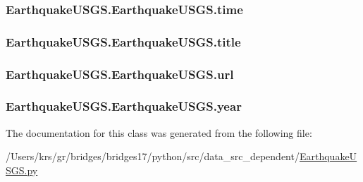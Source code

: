 \subsubsection[{time}]{\setlength{\rightskip}{0pt plus 5cm}Earthquake\+U\+S\+G\+S.\+Earthquake\+U\+S\+G\+S.\+time}\label{class_earthquake_u_s_g_s_1_1_earthquake_u_s_g_s_a6273e67dccfc163a5bd72974371218a0}
\hypertarget{class_earthquake_u_s_g_s_1_1_earthquake_u_s_g_s_a5ee446bf29a35b35c4e13e642c3e247a}{}
\subsubsection[{title}]{\setlength{\rightskip}{0pt plus 5cm}Earthquake\+U\+S\+G\+S.\+Earthquake\+U\+S\+G\+S.\+title}\label{class_earthquake_u_s_g_s_1_1_earthquake_u_s_g_s_a5ee446bf29a35b35c4e13e642c3e247a}
\hypertarget{class_earthquake_u_s_g_s_1_1_earthquake_u_s_g_s_a2636b5997fa6eeb2deb31f739a507eec}{}
\subsubsection[{url}]{\setlength{\rightskip}{0pt plus 5cm}Earthquake\+U\+S\+G\+S.\+Earthquake\+U\+S\+G\+S.\+url}\label{class_earthquake_u_s_g_s_1_1_earthquake_u_s_g_s_a2636b5997fa6eeb2deb31f739a507eec}
\hypertarget{class_earthquake_u_s_g_s_1_1_earthquake_u_s_g_s_a54d0cd00a8318c8170c39544c69353b5}{}
\subsubsection[{year}]{\setlength{\rightskip}{0pt plus 5cm}Earthquake\+U\+S\+G\+S.\+Earthquake\+U\+S\+G\+S.\+year}\label{class_earthquake_u_s_g_s_1_1_earthquake_u_s_g_s_a54d0cd00a8318c8170c39544c69353b5}


The documentation for this class was generated from the following file\+:\begin{DoxyCompactItemize}
\item 
/\+Users/krs/gr/bridges/bridges17/python/src/data\+\_\+src\+\_\+dependent/\hyperlink{_earthquake_u_s_g_s_8py}{Earthquake\+U\+S\+G\+S.\+py}\end{DoxyCompactItemize}
